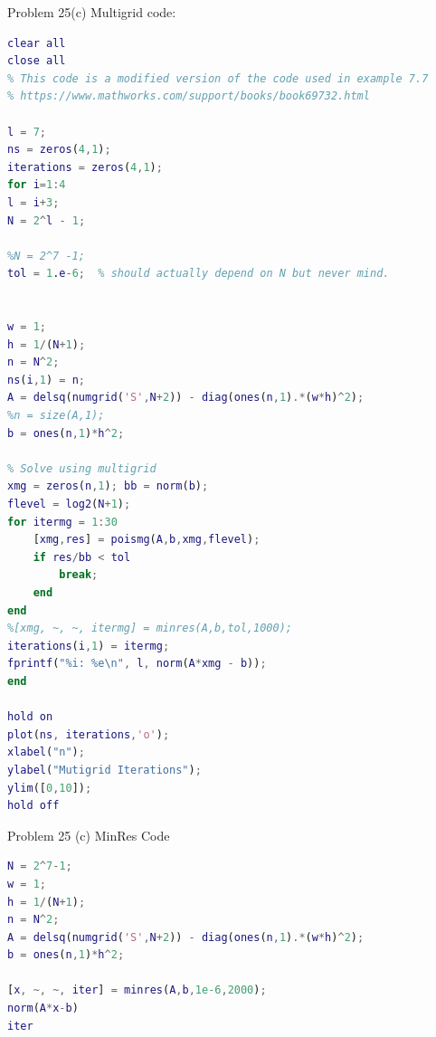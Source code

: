 \documentclass[12pt]{article}
\begin{document}
\large{Problem 25(c) Multigrid code:}
\begin{lstlisting}[language=MATLAB]
clear all
close all
% This code is a modified version of the code used in example 7.7
% https://www.mathworks.com/support/books/book69732.html

l = 7;
ns = zeros(4,1);
iterations = zeros(4,1);
for i=1:4
l = i+3;
N = 2^l - 1;

%N = 2^7 -1;
tol = 1.e-6;  % should actually depend on N but never mind.


w = 1;
h = 1/(N+1);
n = N^2;
ns(i,1) = n;
A = delsq(numgrid('S',N+2)) - diag(ones(n,1).*(w*h)^2);
%n = size(A,1);
b = ones(n,1)*h^2;

% Solve using multigrid
xmg = zeros(n,1); bb = norm(b);
flevel = log2(N+1);
for itermg = 1:30
	[xmg,res] = poismg(A,b,xmg,flevel);
	if res/bb < tol
		break;
	end
end
%[xmg, ~, ~, itermg] = minres(A,b,tol,1000);
iterations(i,1) = itermg;
fprintf("%i: %e\n", l, norm(A*xmg - b));
end

hold on
plot(ns, iterations,'o');
xlabel("n");
ylabel("Mutigrid Iterations");
ylim([0,10]);
hold off
\end{lstlisting}

\large{Problem 25 (c) MinRes Code}
\begin{lstlisting}[language=MATLAB]
N = 2^7-1;
w = 1;
h = 1/(N+1);
n = N^2;
A = delsq(numgrid('S',N+2)) - diag(ones(n,1).*(w*h)^2);
b = ones(n,1)*h^2;

[x, ~, ~, iter] = minres(A,b,1e-6,2000);
norm(A*x-b)
iter
\end{lstlisting}
\end{document}
